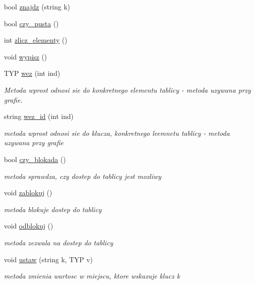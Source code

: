 \begin{DoxyCompactItemize}
bool \hyperlink{classtablica__asocjacyjna_a800e2d6366198e365a0700197b2dced4}{znajdz} (string k)
\item 
bool \hyperlink{classtablica__asocjacyjna_a671f1d928a4d91c6e7708a55b1ce85dc}{czy\-\_\-pusta} ()
\item 
int \hyperlink{classtablica__asocjacyjna_a103aa115af24abf1d08c56e14c87b249}{zlicz\-\_\-elementy} ()
\item 
void \hyperlink{classtablica__asocjacyjna_a8ecdd39391d3dc84aea809c48b52c4d6}{wypisz} ()
\item 
T\-Y\-P \hyperlink{classtablica__asocjacyjna_a52a9625a6eaed5c952bdb28a62b98de9}{wez} (int ind)
\begin{DoxyCompactList}\small\item\em Metoda wprost odnosi sie do konkretnego elementu tablicy -\/ metoda uzywana przy grafie. \end{DoxyCompactList}\item 
string \hyperlink{classtablica__asocjacyjna_ae3dd4ef48ffaacb3d6e7985241e4fcdb}{wez\-\_\-id} (int ind)
\begin{DoxyCompactList}\small\item\em metoda wprost odnosi sie do klucza, konkretnego leemnetu tablicy -\/ metoda uzywana przy grafie \end{DoxyCompactList}\item 
bool \hyperlink{classtablica__asocjacyjna_affe02061bf41d4c433ca445cae152b25}{czy\-\_\-blokada} ()
\begin{DoxyCompactList}\small\item\em metoda sprawdza, czy dostep do tablicy jest mozliwy \end{DoxyCompactList}\item 
void \hyperlink{classtablica__asocjacyjna_a1a801bb889b41a3646553d20992897f8}{zablokuj} ()
\begin{DoxyCompactList}\small\item\em metoda blokuje dostep do tablicy \end{DoxyCompactList}\item 
void \hyperlink{classtablica__asocjacyjna_a6860d1e3736a0766540d21e64c8420ac}{odblokuj} ()
\begin{DoxyCompactList}\small\item\em metoda zezwala na dostep do tablicy \end{DoxyCompactList}\item 
void \hyperlink{classtablica__asocjacyjna_a2ffe030234f0618af8a24020e909dda5}{ustaw} (string k, T\-Y\-P v)
\begin{DoxyCompactList}\small\item\em metoda zmienia wartosc w miejscu, ktore wskazuje klucz k \end{DoxyCompactList}\end{DoxyCompactItemize}
